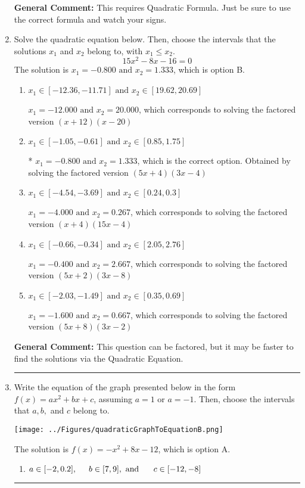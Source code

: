 \documentclass{extbook}[14pt]
\newcommand{\litem}[1]{\item #1

\rule{\textwidth}{0.4pt}}
\begin{document}
\begin{enumerate}
{\textbf{General Comment:} This requires Quadratic Formula. Just be sure to use the correct formula and watch your signs.
}
\litem{
Solve the quadratic equation below. Then, choose the intervals that the solutions $x_1$ and $x_2$ belong to, with $x_1 \leq x_2$.
\[ 15x^{2} -8 x -16 = 0 \]The solution is \( x_1 = -0.800 \text{ and } x_2 = 1.333 \), which is option B.\begin{enumerate}[label=\Alph*.]
\item \( x_1 \in [-12.36, -11.71] \text{ and } x_2 \in [19.62, 20.69] \)

$x_1 = -12.000 \text{ and } x_2 = 20.000$, which corresponds to solving the factored version $(x + 12)(x -20)$
\item \( x_1 \in [-1.05, -0.61] \text{ and } x_2 \in [0.85, 1.75] \)

* $x_1 = -0.800 \text{ and } x_2 = 1.333$, which is the correct option. Obtained by solving the factored version $(5x + 4)(3x -4)$
\item \( x_1 \in [-4.54, -3.69] \text{ and } x_2 \in [0.24, 0.3] \)

$x_1 = -4.000 \text{ and } x_2 = 0.267$, which corresponds to solving the factored version $(x + 4)(15x -4)$
\item \( x_1 \in [-0.66, -0.34] \text{ and } x_2 \in [2.05, 2.76] \)

$x_1 = -0.400 \text{ and } x_2 = 2.667$, which corresponds to solving the factored version $(5x + 2)(3x -8)$
\item \( x_1 \in [-2.03, -1.49] \text{ and } x_2 \in [0.35, 0.69] \)

$x_1 = -1.600 \text{ and } x_2 = 0.667$, which corresponds to solving the factored version $(5x + 8)(3x -2)$
\end{enumerate}

\textbf{General Comment:} This question can be factored, but it may be faster to find the solutions via the Quadratic Equation.
}
\litem{
Write the equation of the graph presented below in the form $f(x)=ax^2+bx+c$, assuming  $a=1$ or $a=-1$. Then, choose the intervals that $a, b,$ and $c$ belong to.

\begin{center}
    \texttt{[image: ../Figures/quadraticGraphToEquationB.png]}
\end{center}


The solution is \( f(x) = -x^{2} +8 x -12 \), which is option A.\begin{enumerate}[label=\Alph*.]
\item \( a \in [-2, 0.2], \hspace*{5mm} b \in [7, 9], \text{ and } \hspace*{5mm} c \in [-12, -8] \)


\end{enumerate}}
\end{enumerate}
\end{document}
